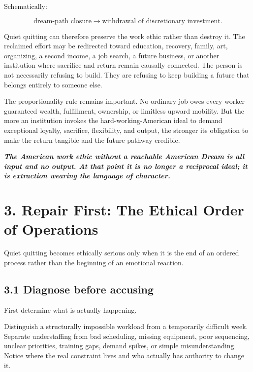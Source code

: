 \documentclass[11pt,oneside]{article}
\renewenvironment{quote}
  {\begin{tcolorbox}[
      enhanced,
      breakable,
      colback=ManifestLight,
      colframe=ManifestRule,
      boxrule=0pt,
      leftrule=3pt,
      arc=0pt,
      outer arc=0pt,
      left=10pt,right=10pt,top=8pt,bottom=8pt,
      before skip=0.8em,after skip=0.8em
    ]\itshape}
  {\end{tcolorbox}}
\begin{document}
Schematically:

\[
\text{dream-path closure}
\longrightarrow
\text{withdrawal of discretionary investment}.
\]

Quiet quitting can therefore preserve the work ethic rather than destroy
it. The reclaimed effort may be redirected toward education, recovery,
family, art, organizing, a second income, a job search, a future business,
or another institution where sacrifice and return remain causally
connected. The person is not necessarily refusing to build. They are
refusing to keep building a future that belongs entirely to someone
else.

The proportionality rule remains important. No ordinary job owes every
worker guaranteed wealth, fulfillment, ownership, or limitless upward
mobility. But the more an institution invokes the hard-working-American
ideal to demand exceptional loyalty, sacrifice, flexibility, and output,
the stronger its obligation to make the return tangible and the future
pathway credible.

\begin{quote}
\textbf{The American work ethic without a reachable American Dream is all
input and no output. At that point it is no longer a reciprocal ideal;
it is extraction wearing the language of character.}
\end{quote}

\section{3. Repair First: The Ethical Order of
Operations}\label{repair-first-the-ethical-order-of-operations}

Quiet quitting becomes ethically serious only when it is the end of an
ordered process rather than the beginning of an emotional reaction.

\subsection{3.1 Diagnose before
accusing}\label{diagnose-before-accusing}

First determine what is actually happening.

Distinguish a structurally impossible workload from a temporarily
difficult week. Separate understaffing from bad scheduling, missing
equipment, poor sequencing, unclear priorities, training gaps, demand
spikes, or simple misunderstanding. Notice where the real constraint
lives and who actually has authority to change it.
\end{document}
